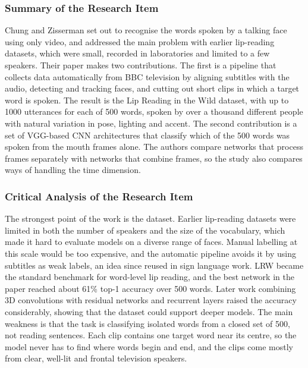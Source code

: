 \documentclass{FastFyp}
\begin{document}
\subsubsection*{Summary of the Research Item}
Chung and Zisserman \cite{ref:Chung:2016} set out to recognise the words spoken by a talking face using only video, and addressed the main problem with earlier lip-reading datasets, which were small, recorded in laboratories and limited to a few speakers. Their paper makes two contributions. The first is a pipeline that collects data automatically from BBC television by aligning subtitles with the audio, detecting and tracking faces, and cutting out short clips in which a target word is spoken. The result is the Lip Reading in the Wild dataset, with up to 1000 utterances for each of 500 words, spoken by over a thousand different people with natural variation in pose, lighting and accent. The second contribution is a set of VGG-based CNN architectures that classify which of the 500 words was spoken from the mouth frames alone. The authors compare networks that process frames separately with networks that combine frames, so the study also compares ways of handling the time dimension.

\subsubsection*{Critical Analysis of the Research Item}
The strongest point of the work is the dataset. Earlier lip-reading datasets were limited in both the number of speakers and the size of the vocabulary, which made it hard to evaluate models on a diverse range of faces. Manual labelling at this scale would be too expensive, and the automatic pipeline avoids it by using subtitles as weak labels, an idea since reused in sign language work. LRW became the standard benchmark for word-level lip reading, and the best network in the paper reached about 61\% top-1 accuracy over 500 words. Later work combining 3D convolutions with residual networks and recurrent layers raised the accuracy considerably, showing that the dataset could support deeper models. The main weakness is that the task is classifying isolated words from a closed set of 500, not reading sentences. Each clip contains one target word near its centre, so the model never has to find where words begin and end, and the clips come mostly from clear, well-lit and frontal television speakers.
\end{document}

